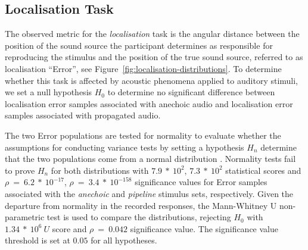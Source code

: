 \subsection{Localisation Task}\label{sec:localisation-results}
The observed metric for the \emph{localisation} task is the angular distance between the position of the sound source the participant determines as responsible for reproducing the stimulus and the position of the true sound source, referred to as localisation ``Error'', see Figure~\ref{fig:localisation-distributions}. To determine whether this task is affected by acoustic phenomena applied to auditory stimuli, we set a null hypothesis $H_0$ to determine no significant difference between localisation error samples associated with anechoic audio and localisation error samples associated with propagated audio. \par
The two Error populations are tested for normality to evaluate whether the assumptions for conducting variance tests by setting a hypothesis $H_n$ determine that the two populations come from a normal distribution \citep{pearson1977tests}. Normality tests fail to prove $H_n$ for both distributions with $7.9\ *\ 10^2$, $7.3\ *\ 10^2$ statistical scores and $\rho\ =\ 6.2\ *\ 10^{-17}$, $\rho\ =\ 3.4\ *\ 10^{-158}$ significance values for Error samples associated with the \emph{anechoic} and \emph{pipeline} stimulus sets, respectively. Given the departure from normality in the recorded responses, the Mann-Whitney U non-parametric test is used to compare the distributions, rejecting $H_0$ with $1.34\ *\ 10^6\ U$ score and $\rho\ =\ 0.042$ significance value. The significance value threshold is set at $0.05$ for all hypotheses. \par

